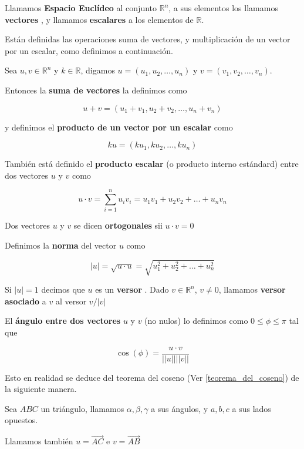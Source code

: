 \begin{definition}
Llamamos \textbf{Espacio Euclídeo} al conjunto $\mathbb{R}^n$, a sus elementos los llamamos \textbf{vectores} , y llamamos \textbf{escalares} a los elementos de $\mathbb{R}$.

Están definidas las operaciones suma de vectores, y multiplicación de un vector por un escalar, como definimos a continuación.

Sea $u,v \in \mathbb{R}^n$ y $k \in \mathbb{R}$, digamos $u = (u_1, u_2, \ldots, u_n)$ y $v = (v_1, v_2, \ldots, v_n)$.

Entonces la \textbf{suma de vectores}  la definimos como

$$ u + v = (u_1 + v_1, u_2 + v_2, \ldots, u_n + v_n) $$

y definimos el \textbf{producto de un vector por un escalar}  como

$$ ku = (k u_1, k u_2, \ldots, k u_n) $$

También está definido el \textbf{producto escalar}  (o producto interno estándard) entre dos vectores $u$ y $v$ como

$$ u \cdot v = \sum_{i=1}^n u_i v_i = u_1 v_1 + u_2 v_2 + \ldots + u_n v_n $$

Dos vectores $u$ y $v$ se dicen \textbf{ortogonales}  sii $u \cdot v = 0$

Definimos la \textbf{norma}  del vector $u$ como

$$ |u| = \sqrt{u \cdot u} = \sqrt{u_1^2 + u_2^2 + \ldots + u_n^2}$$

Si $|u| = 1$ decimos que $u$ es un \textbf{versor} .  Dado $v \in \mathbb{R}^n$, $v \neq 0$, llamamos \textbf{versor asociado} a $v$ al versor $v / |v|$

El \textbf{ángulo entre dos vectores}  $u$ y $v$ (no nulos) lo definimos como $ 0 \leq \phi \leq \pi $ tal que

$$ \cos(\phi) = \frac{u \cdot v}{||u|| ||v||}$$

Esto en realidad se deduce del teorema del coseno (Ver \ref{teorema_del_coseno}) de la siguiente manera.

Sea $ABC$ un triángulo, llamamos $\alpha, \beta, \gamma$ a sus ángulos, y $a,b,c$ a sus lados opuestos.

Llamamos también $u = \vec{AC}$ e $v = \vec{AB}$


\end{definition}
